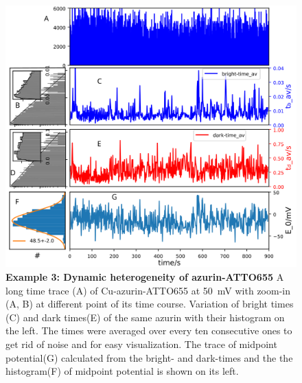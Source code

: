 \begin{figure}[!ht]
  \centering
  \includegraphics[width=\textwidth]{dynamic_Point_20_75mV_S105}
  \makeatletter
  \renewcommand{\fnum@figure}{\figurename~S\thefigure}
  \makeatother  
  \caption{\textbf{Example 3: Dynamic heterogeneity of azurin-ATTO655}
  A long time trace (A) of Cu-azurin-ATTO655 at \SI{50}{\mV} with zoom-in (A, B) at different point of its time course.
  Variation of bright times (C) and dark times(E) of the same azurin with their histogram on the left.
  The times were averaged over every ten consecutive ones to get rid of noise and for easy visualization.
  The trace of midpoint potential(G) calculated from the bright- and dark-times and the the histogram(F) of midpoint potential is shown on its left.
  }
  \label{SIfig:dynamic_Point_20_75mV_S105}
\end{figure}

